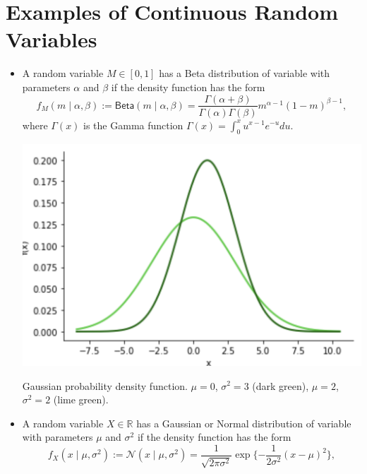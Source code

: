 \documentclass{tufte-handout}
\begin{document}
\section{Examples  of Continuous Random Variables } 
\begin{itemize}
\item A  random variable $M\in[0,1]$ has a Beta distribution of variable with parameters $\alpha$ and $\beta$ if the density function has the form
  \begin{equation*}
  f_M(m\mid \alpha,\beta) := \mathsf{Beta}(m \mid \alpha,\beta)  = \frac{\Gamma(\alpha+\beta)}{\Gamma(\alpha)\Gamma(\beta)} m^{\alpha-1}(1-m)^{\beta-1},
  \end{equation*}
  where $\Gamma(x)$ is the Gamma function  $\Gamma(x)=\int_0^{x} u^{x-1} e^{-u}  du$.
  
\begin{marginfigure}
\centering
\includegraphics{fig/gauss2.png}

\caption{Gaussian probability density function. $\mu=0$, $\sigma^2=3$ (dark green), $\mu=2$, $\sigma^2=2$ (lime green).
}
\end{marginfigure}

 \item A  random variable $X\in \mathbb R$ has a Gaussian or Normal distribution of variable with parameters $\mu$ and $\sigma^2$ if the density function has the form
   \begin{equation*}
  f_X(x\mid \mu,\sigma^2) := \mathcal{N}(x \mid\mu,\sigma^2)  = \frac{1}{\sqrt{2\pi\sigma^2}} \exp\{-\frac{1}{2\sigma^2} (x-\mu)^2\},
  \end{equation*}
\end{itemize}
\end{document}
